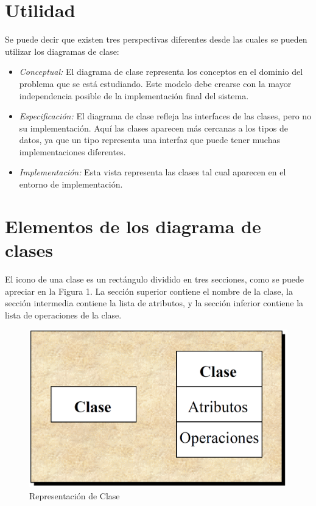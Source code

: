 \documentclass[12pt,letterpaper]{article}
\begin{document}
\section*{\LARGE\textbf{Utilidad}}
Se puede decir que existen tres perspectivas diferentes desde las cuales se pueden utilizar los diagramas de clase:

\begin{itemize}
    \item \textit{Conceptual:} El diagrama de clase representa los conceptos en el dominio del problema que se está estudiando. Este modelo debe crearse con la mayor independencia posible de la implementación final del sistema.
    \item \textit{Especificación:} El diagrama de clase refleja las interfaces de las clases, pero no su implementación. Aquí las clases aparecen más cercanas a los tipos de datos, ya que un tipo representa una interfaz que puede tener muchas implementaciones diferentes.
    \item \textit{Implementación:} Esta vista representa las clases tal cual aparecen en el entorno de implementación.
\end{itemize}
\vspace{1cm}

\section*{\LARGE\textbf{Elementos de los diagrama de clases}}
El icono de una clase es un rectángulo dividido en tres secciones, como se puede apreciar en la Figura 1. La sección superior contiene el nombre de la clase, la sección intermedia contiene la lista de atributos, y la sección inferior contiene la lista de operaciones de la clase.\\

	\begin{figure}[H]
		\centering
		\includegraphics[scale=0.2]{img/clases.PNG}     
		\caption{Representación de Clase }
	\label{fig:rc}
	\end{figure}
	
\end{document}
